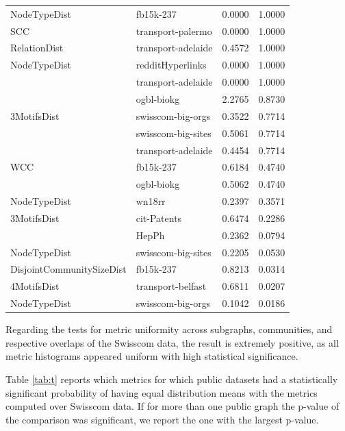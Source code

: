 \begin{table}[H]
\begin{tabular}{llrr}
NodeTypeDist & fb15k-237 &       0.0000 &        1.0000 \\
SCC & transport-palermo &       0.0000 &        1.0000 \\
RelationDist & transport-adelaide &       0.4572 &        1.0000 \\
NodeTypeDist & redditHyperlinks &       0.0000 &        1.0000 \\
             & transport-adelaide &       0.0000 &        1.0000 \\
             & ogbl-biokg &       2.2765 &        0.8730 \\
3MotifsDist & swisscom-big-orgs &       0.3522 &        0.7714 \\
             & swisscom-big-sites &       0.5061 &        0.7714 \\
             & transport-adelaide &       0.4454 &        0.7714 \\
WCC & fb15k-237 &       0.6184 &        0.4740 \\
             & ogbl-biokg &       0.5062 &        0.4740 \\
NodeTypeDist & wn18rr &       0.2397 &        0.3571 \\
3MotifsDist & cit-Patents &       0.6474 &        0.2286 \\
             & HepPh &       0.2362 &        0.0794 \\
NodeTypeDist & swisscom-big-sites &       0.2205 &        0.0530 \\
DisjointCommunitySizeDist & fb15k-237 &       0.8213 &        0.0314 \\
4MotifsDist & transport-belfast &       0.6811 &        0.0207 \\
NodeTypeDist & swisscom-big-orgs &       0.1042 &        0.0186 \\
\bottomrule
\end{tabular}
\end{table}

Regarding the tests for metric uniformity across subgraphs, communities, and respective overlaps of the Swisscom data, the result is extremely positive, as all metric histograms appeared uniform with high statistical significance. 

Table \ref{tab:t} reports which metrics for which public datasets had a statistically significant probability of having equal distribution means with the metrics computed over Swisscom data. If for more than one public graph the p-value of the comparison was significant, we report the one with the largest p-value. 

